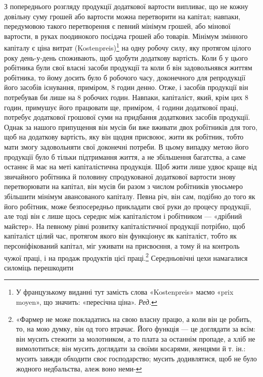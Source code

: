 З попереднього розгляду продукції додаткової вартости випливає,
що не кожну довільну суму грошей або вартости можна
перетворити на капітал; навпаки, передумовою такого перетворення
є певний мінімум грошей, або мінової вартости, в руках
поодинокого посідача грошей або товарів. Мінімум змінного капіталу
є ціна витрат (Kostenpreis)\footnote*{
У французькому виданні тут замість слова «Kostenpreis» маємо
«prix moyen», що значить: «пересічна ціна». \emph{Ред.}
} на одну робочу силу, яку протягом
цілого року день-у-день споживають, щоб здобути додаткову
вартість. Коли б у цього робітника були свої власні засоби
продукції та коли б він задовольнявся життям робітника,
то йому досить було б робочого часу, доконечного для репродукції
його засобів існування, приміром, 8 годин денно. Отже, і
засобів продукції він потребував би лише на 8 робочих годин.
Навпаки, капіталіст, який, крім цих 8 годин, примушує його
працювати ще, приміром, 4 години додаткової праці, потребує
додаткової грошової суми на придбання додаткових засобів продукції.
Однак за нашого припущення він мусів би вже вживати
двох робітників для того, щоб на додаткову вартість, яку він
щодня присвоює, жити як робітник, тобто мати змогу задовольняти
свої доконечні потреби. В цьому випадку метою його продукції
було б тільки підтримання життя, а не збільшення багатства,
а саме останнє й має на меті капіталістична продукція.
Щоб жити лише удвоє краще від звичайного робітника й половину
спродукованої додаткової вартости знову перетворювати
на капітал, він мусів би разом з числом робітників увосьмеро
збільшити мінімум авансованого капіталу. Певна річ, він сам,
подібно до того як його робітник, може безпосередньо прикладати
свої руки до процесу продукції, але тоді він є лише щось середнє
між капіталістом і робітником — «дрібний майстер». На певному
рівні розвитку капіталістичної продукції потрібно, щоб капіталіст
цілий час, протягом якого він функціонує як капіталіст,
тобто як персоніфікований капітал, міг уживати на присвоєння,
а тому й на контроль чужої праці, і на продаж продуктів цієї
праці.\footnote{
«Фармер не може покладатись на свою власну працю, а коли
він це робить, то, на мою думку, він од того втрачає. Його функція — це
доглядати за всім: він мусить стежити за молотником, а то плата за останнім
пропаде, а хліб не вимолотиться; він мусить доглядати за своїми
косарями, женцями й т. ін.: мусить завжди обходити своє господарство;
мусить додивлятися, щоб не було жодного недбальства, алеж воно неми-
} Середньовічні цехи намагалися силоміць перешкодити


